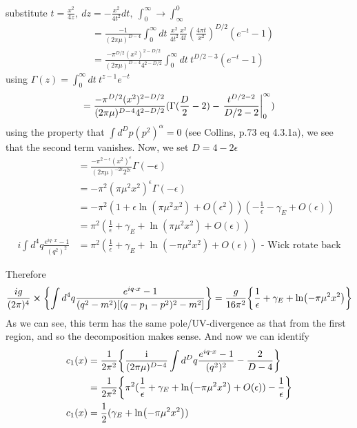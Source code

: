 \documentclass{article}
\begin{document}
substitute $t = \frac{x^2}{4z},\ dz=-\frac{x^2}{4t^2}dt,\ \int_0^\infty \rightarrow \int_\infty^0$
\begin{equation}
\begin{split}    
    &= \frac{-1}{(2\pi\mu)^{D-4}}\int_0^\infty  dt\ \frac{x^2}{4t^2} \frac{x^2}{4t}
    (\frac{4\pi t}{x^2})^{D/2}(e^{-t}-1)\\
    &= \frac{-\pi^{D/2}(x^2)^{2-D/2}}{(2\pi\mu)^{D-4}4^{2-D/2}}\int_0^\infty  dt\ t^{D/2-3}(e^{-t}-1)
\end{split}
\end{equation}
using $\Gamma(z)=\int_0^\infty dt\ t^{z-1}e^{-t}$
\begin{equation}
    = \frac{-\pi^{D/2}(x^2)^{2-D/2}}{(2\pi\mu)^{D-4}4^{2-D/2}}(\Gamma(\frac{D}{2}-2)-\eval{\frac{t^{D/2-2}}{D/2-2}}_0^\infty )
\end{equation}
using the property that $\int d^Dp(p^2)^\alpha = 0$ (see Collins, p.73 eq 4.3.1a), we see that the second term vanishes. Now, we set $D=4-2\epsilon$
\begin{equation}
\begin{split}
    &= \frac{-\pi^{2-\epsilon}(x^2)^{\epsilon}}{(2\pi\mu)^{-2\epsilon}2^{2\epsilon}}\Gamma(-\epsilon)\\
    &= -\pi^2(\pi\mu^2 x^2)^\epsilon\Gamma(-\epsilon)\\
    &= -\pi^2 (1+\epsilon \ln(\pi \mu^2 x^2)+O(\epsilon^2))(-\frac{1}{\epsilon}-\gamma_E+O(\epsilon))\\
    &= \pi^2(\frac{1}{\epsilon}+\gamma_E+\ln(\pi\mu^2 x^2)+O(\epsilon))\\
    i\int d^4q\frac{e^{iq\cdot x}-1}{(q^2)^2}&= \pi^2(\frac{1}{\epsilon}+\gamma_E+\ln(-\pi\mu^2 x^2)+O(\epsilon))\text{ - Wick rotate back}
\end{split}
\end{equation}

Therefore
\begin{equation}
    \frac{ig}{(2\pi)^4}\cross\qty{\int d^4q \frac{e^{iq\cdot x}-1}{(q^2-m^2)[(q-p_1-p^2)^2-m^2]}} = \frac{g}{16\pi^2}\qty{\frac{1}{\epsilon}+\gamma_E+\ln(-\pi\mu^2 x^2)}
\end{equation}
As we can see, this term has the same pole/UV-divergence as that from the first region, and so the decomposition makes sense. And now we can identify
\begin{equation}
\begin{split}
    c_1(x) &= \frac{1}{2\pi^2} \qty{\frac{\text{i}}{(2\pi\mu)^{D-4}}\int d^Dq\frac{e^{iq\cdot x}-1}{(q^2)^2}-\frac{2}{D-4}}\\
    &=\frac{1}{2\pi^2} \qty{\pi^2(\frac{1}{\epsilon}+\gamma_E+\ln(-\pi\mu^2 x^2)+O(\epsilon))-\frac{1}{\epsilon}}\\
    c_1(x)&=\frac{1}{2}(\gamma_E+\ln(-\pi\mu^2 x^2))
\end{split}
\end{equation}
\end{document}
